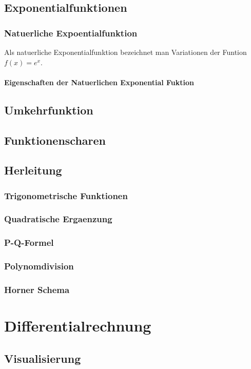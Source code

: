 \documentclass[a4paper]{article} %
\begin{document}
		\subsection{Exponentialfunktionen}
		\subsubsection{Natuerliche Expoentialfunktion}
		Als natuerliche Exponentialfunktion bezeichnet man Variationen der Funtion $f(x)=e^x$.
		\paragraph{Eigenschaften der Natuerlichen Exponential Fuktion}
		\subsection{Umkehrfunktion}
		\subsection{Funktionenscharen}
		\subsection{Herleitung}
		\subsubsection{Trigonometrische Funktionen}
		\subsubsection{Quadratische Ergaenzung}
		\subsubsection{P-Q-Formel}
		\subsubsection{Polynomdivision}
		\subsubsection{Horner Schema}
	\newpage
	\section{Differentialrechnung}
	\subsection{Visualisierung}
	
\end{document}
